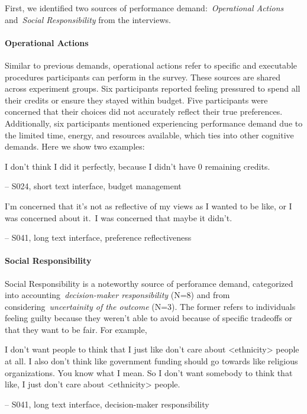 First, we identified two sources of performance demand:~\textit{Operational Actions} and~\textit{Social Responsibility} from the interviews. 

\paragraph{Operational Actions}
Similar to previous demands, operational actions refer to specific and executable procedures participants can perform in the survey. These sources are shared across experiment groups. Six participants reported feeling pressured to spend all their credits or ensure they stayed within budget. Five participants were concerned that their choices did not accurately reflect their true preferences. Additionally, six participants mentioned experiencing performance demand due to the limited time, energy, and resources available, which ties into other cognitive demands. Here we show two examples:

\begin{displayquote}
I don't think I did it perfectly, because I didn't have 0 remaining credits.
    
\noindent \hfill -- S024, short text interface, budget management
\end{displayquote}

\begin{displayquote}
I'm concerned that it's not as reflective of my views as I wanted to be like, or I was concerned about it.~\bracketellipsis I was concerned that maybe it didn't.

\noindent \hfill -- S041, long text interface, preference reflectiveness
\end{displayquote}

\paragraph{Social Responsibility}
Social Responsibility is a noteworthy source of perforamce demand, categorized into accounting~\textit{decision-maker responsibility} (N=8) and from considering~\textit{uncertainity of the outcome} (N=3). The former refers to individuals feeling guilty because they weren't able to avoid because of specific tradeoffs or that they want to be fair. For example, 

\begin{displayquote}
I don't want people to think that I just like don't care about <ethnicity> people at all. I also don't think like government funding should go towards like religious organizations. You know what I mean. So I don't want somebody to think that like, I just don't care about <ethnicity> people.
    
\noindent \hfill -- S041, long text interface, decision-maker responsibility
\end{displayquote}

